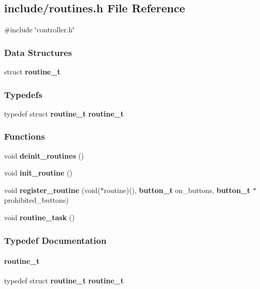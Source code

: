 \subsection{include/routines.h File Reference}
\label{a00059}
{\ttfamily \#include \char`\"{}controller.\+h\char`\"{}}\newline
\subsubsection*{Data Structures}
\begin{DoxyCompactItemize}
\item 
struct \textbf{ routine\+\_\+t}
\end{DoxyCompactItemize}
\subsubsection*{Typedefs}
\begin{DoxyCompactItemize}
\item 
typedef struct \textbf{ routine\+\_\+t} \textbf{ routine\+\_\+t}
\end{DoxyCompactItemize}
\subsubsection*{Functions}
\begin{DoxyCompactItemize}
\item 
void \textbf{ deinit\+\_\+routines} ()
\item 
void \textbf{ init\+\_\+routine} ()
\item 
void \textbf{ register\+\_\+routine} (void($\ast$routine)(), \textbf{ button\+\_\+t} on\+\_\+buttons, \textbf{ button\+\_\+t} $\ast$prohibited\+\_\+buttons)
\item 
void \textbf{ routine\+\_\+task} ()
\end{DoxyCompactItemize}


\subsubsection{Typedef Documentation}
\mbox{\label{a00059_a9105ef626cef6848419da1a89fe90e07}} 
\paragraph{routine\+\_\+t}
{\footnotesize\ttfamily typedef struct \textbf{ routine\+\_\+t} \textbf{ routine\+\_\+t}}



